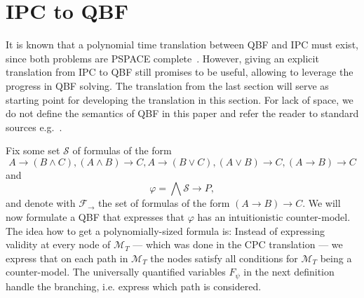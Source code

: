 \documentclass[a4paper,UKenglish,cleveref, autoref, thm-restate]{lipics-v2021}
\begin{document}
\section{IPC to QBF}

It is known that a polynomial time translation between QBF and IPC must exist, since both problems are PSPACE complete~\cite{garey1979computers, statman1979intuitionistic}.
However, giving an explicit translation from IPC to QBF still promises to be useful, allowing to leverage the progress in QBF solving.
The translation from the last section will serve as starting point for developing the translation in this section.
For lack of space, we do not define the semantics of QBF in this paper and refer the reader to standard sources e.g.~\cite{series/faia/2009-185}.

Fix some set $\mathcal S$ of formulas of the form $$A\to (B\wedge C), (A\wedge B)\to C, A\to (B\vee C), (A\vee B)\to C, (A\to B)\to C$$and$$\varphi = \bigwedge \mathcal S\to P,$$
and denote with $\mathcal F_\to$ the set of formulas of the form $(A\to B)\to C$. We will now formulate a QBF that expresses that $\varphi$ has an intuitionistic counter-model. The idea how to get a polynomially-sized formula is: Instead of expressing validity at every node of $\mathcal M_T$ --- which was done in the CPC translation --- we express that on each path in $\mathcal M_T$ the nodes satisfy all conditions for $\mathcal M_T$ being a counter-model. The universally quantified variables $F_\psi$ in the next definition handle the branching, i.e. express which path is considered.
\end{document}
